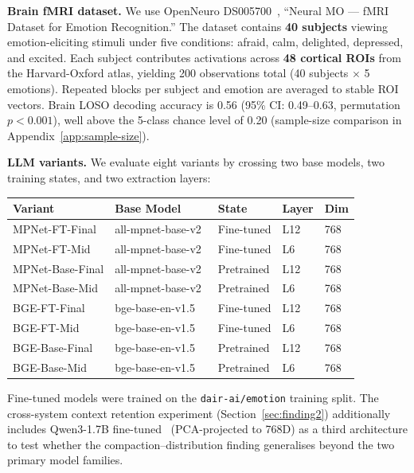\documentclass{article}
\begin{document}
\textbf{Brain fMRI dataset.}
We use OpenNeuro DS005700~\citep{openneuro2024}, ``Neural MO --- fMRI Dataset for
Emotion Recognition.''
The dataset contains \textbf{40 subjects} viewing emotion-eliciting stimuli under five
conditions: afraid, calm, delighted, depressed, and excited.
Each subject contributes activations across \textbf{48 cortical ROIs} from the
Harvard-Oxford atlas, yielding 200 observations total (40 subjects $\times$ 5 emotions).
Repeated blocks per subject and emotion are averaged to stable ROI vectors.
Brain LOSO decoding accuracy is 0.56 (95\% CI: 0.49--0.63, permutation $p<0.001$),
well above the 5-class chance level of 0.20 (sample-size comparison in
Appendix~\ref{app:sample-size}).

\textbf{LLM variants.}
We evaluate eight variants by crossing two base models, two training states, and two
extraction layers:

\begin{center}
\small
\begin{tabular}{lllll}
\toprule
Variant & Base Model & State & Layer & Dim \\
\midrule
MPNet-FT-Final  & all-mpnet-base-v2~\citep{song2020} & Fine-tuned & L12 & 768 \\
MPNet-FT-Mid    & all-mpnet-base-v2 & Fine-tuned & L6  & 768 \\
MPNet-Base-Final& all-mpnet-base-v2 & Pretrained & L12 & 768 \\
MPNet-Base-Mid  & all-mpnet-base-v2 & Pretrained & L6  & 768 \\
BGE-FT-Final    & bge-base-en-v1.5~\citep{xiao2023} & Fine-tuned & L12 & 768 \\
BGE-FT-Mid      & bge-base-en-v1.5 & Fine-tuned & L6  & 768 \\
BGE-Base-Final  & bge-base-en-v1.5 & Pretrained & L12 & 768 \\
BGE-Base-Mid    & bge-base-en-v1.5 & Pretrained & L6  & 768 \\
\bottomrule
\end{tabular}
\end{center}

Fine-tuned models were trained on the \texttt{dair-ai/emotion} training split.
The cross-system context retention experiment (Section~\ref{sec:finding2}) additionally
includes Qwen3-1.7B fine-tuned~\citep{qwen2025} (PCA-projected to 768D) as a third
architecture to test whether the compaction--distribution finding generalises beyond
the two primary model families.

\end{document}

